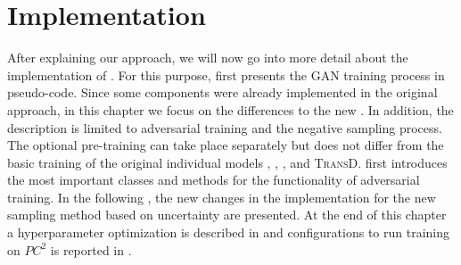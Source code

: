 \chapter{Implementation}
\label{ch:implementation}
%
After explaining our approach, we will now go into more detail about the implementation of \usgan.
For this purpose,  first presents the \ac{GAN} training process in pseudo-code.
Since some components were already implemented in the original \kbgan approach, in this chapter we focus on the differences to the new \usgan.
In addition, the description is limited to adversarial training and the negative sampling process.
The optional pre-training can take place separately but does not differ from the basic training of the original individual models \distmult, \complex, \transe, and \textsc{TransD}.
 first introduces the most important classes and methods for the functionality of adversarial training.
In the following , the new changes in the implementation for the new sampling method based on uncertainty are presented.
At the end of this chapter a hyperparameter optimization is described in  and configurations to run training on $PC^2$ is reported in .








\clearpage
